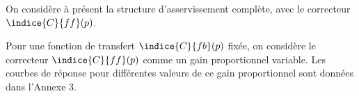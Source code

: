 On considère à présent la structure d'asservissement complète, avec le correcteur $\indice{C}{ff} (p)$.



Pour une fonction de transfert $\indice{C}{fb} (p)$ fixée, on considère le correcteur $\indice{C}{ff}(p)$ comme un gain
proportionnel variable. Les courbes de réponse pour différentes valeurs de ce gain proportionnel
sont données dans l'Annexe 3.


